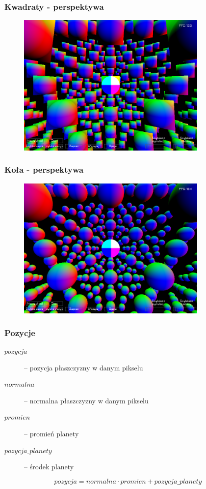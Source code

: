 \documentclass{beamer}
\begin{document}
\frame
{
	\frametitle{Kwadraty - perspektywa}
	\begin{figure}
	\centering
		\includegraphics[height=7cm]{img/per1.png}
	\label{fig:per1}
	\end{figure}
}

\frame
{
	\frametitle{Koła - perspektywa}
	\begin{figure}
	\centering
		\includegraphics[height=7cm]{img/per2.png}
	\label{fig:per2}
	\end{figure}
	\setcounter{subfigure}{0}
}

\frame
{
	\frametitle{Pozycje}

	\begin{description}
	\item[$pozycja$] -- pozycja płaszczyzny w danym pikselu
	\item[$normalna$] -- normalna płaszczyzny w danym pikselu
	\item[$promien$] -- promień planety
	\item[$pozycja\_planety$] -- środek planety
	\end{description}

	$$ pozycja = normalna \cdot promien + pozycja\_planety $$
}
\end{document}
